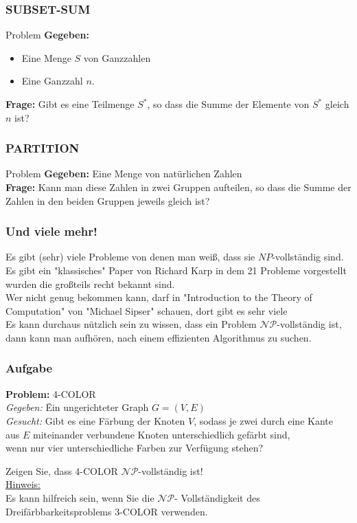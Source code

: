 \documentclass{beamer}
\begin{document}
{\begin{frame}
\frametitle{SUBSET-SUM}
\begin{block}{Problem}
\textbf{Gegeben:}
\begin{itemize}
 \item Eine Menge $S$ von Ganzzahlen
 \item Eine Ganzzahl $n$.
\end{itemize}
\textbf{Frage:}
Gibt es eine Teilmenge $S^*$, so dass die Summe der Elemente von $S^*$ gleich $n$ ist?
\end{block}
\end{frame}
\begin{frame}
\frametitle{PARTITION}
\begin{block}{Problem}
\textbf{Gegeben:} Eine Menge von natürlichen Zahlen\\
\textbf{Frage:} Kann man diese Zahlen in zwei Gruppen aufteilen, so dass die Summe der Zahlen in den beiden Gruppen jeweils gleich ist?
\end{block}
\end{frame}
\begin{frame}
\frametitle{Und viele mehr!}
Es gibt (sehr) viele Probleme von denen man weiß, dass sie $NP$-vollständig sind. Es gibt ein "klassisches" Paper von Richard Karp in dem 21 Probleme vorgestellt wurden die großteils recht bekannt sind.\\
Wer nicht genug bekommen kann, darf in "Introduction to the Theory of Computation" von "Michael Sipser" schauen, dort gibt es sehr viele\\[10pt]
Es kann durchaus nützlich sein zu wissen, dass ein Problem $\mathcal{NP}$-vollständig ist, dann kann man aufhören, nach einem effizienten Algorithmus zu suchen.
\end{frame}

\begin{frame}
\frametitle{Aufgabe}
\begin{tabbing}
\textbf{Problem:} 4-COLOR\\
\textit{Gegeben:} \= Ein ungerichteter Graph $G = (V,E)$\\
\textit{Gesucht:} \> Gibt es eine Färbung der Knoten $V$, sodass je zwei durch eine Kante \\
\> aus $E$ miteinander verbundene Knoten unterschiedlich gefärbt sind,\\
\> wenn nur vier unterschiedliche Farben zur Verfügung stehen?
\end{tabbing}

Zeigen Sie, dass 4-COLOR $\mathcal{NP}$-vollständig ist!\\[8pt]
\underline{Hinweis:}\\
Es kann hilfreich sein, wenn Sie die $\mathcal{NP}$-
Vollständigkeit des Dreifärbbarkeitsproblems 3-COLOR verwenden.
\end{frame}

}
\end{document}
